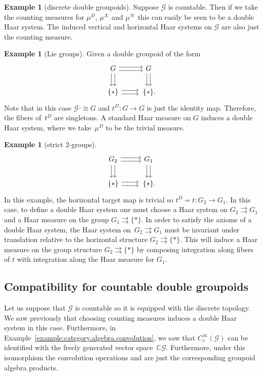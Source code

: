 \documentclass[10pt,a4paper]{amsart}
\numberwithin{equation}{section}
\theoremstyle{definition}
\newtheorem{Example}[Theorem]{Example}
\newcommand{\BBC}{\mathbb{C}}
\newcommand{\CG}{\mathcal{G}}
\newcommand{\CH}{\mathcal{H}}
\newcommand{\CK}{\mathcal{K}}
\newcommand{\stardot}{\overset{{\bullet}}{*}}
\newcommand{\starcirc}{\overset{\circ}{*}}
\newcommand{\darrow}{\arrow[d, shift right] \arrow[d, shift left]}
\newcommand{\rarrow}{\arrow[r, shift right] \arrow[r, shift left]}
\newcommand{\grpd}{\rightrightarrows}
\begin{document}
\begin{Example}[discrete double groupoids]
   Suppose $ \CG $ is countable. Then if we take the counting measures for $ \mu^D$, $ \mu^\CK$ and $ \mu^\CH $ this can easily be seen to be a double Haar system. The induced vertical and horizontal Haar systems on $ \CG $ are also just the counting measure.
\end{Example}
\begin{Example}[Lie groups]\label{example:Lie.groups}
Given a double groupoid of the form
  \[\begin{tikzcd}
G \darrow \rarrow & G \darrow \\
\{*\} \rarrow & \,\{*\}.
\end{tikzcd}
\]
Note that in this case $ \CG^\lrcorner \cong G $ and $ t^D \colon G \to G $ is just the identity map. Therefore, the fibers of~$ t^D $ are singletons. A standard Haar measure on $ G $ induces a double Haar system, where we take~$ \mu^D $ to be the trivial measure.
\end{Example}
\begin{Example}[strict 2-groups]
    \[\begin{tikzcd}
G_2 \darrow \rarrow & G_1 \darrow \\
\{*\} \rarrow & \,\{*\}.
\end{tikzcd}
\]
In this example, the horizontal target map is trivial so $ t^D = t \colon G_2 \to G_1 $. In this case, to define a double Haar system one must choose a Haar system on $ G_2 \grpd G_1 $ and a Haar measure on the group $ G_1 \grpd \{ * \} $. In order to satisfy the axioms of a double Haar system, the Haar system on~${ G_2 \grpd G_1}$ must be invariant under translation relative to the horizontal structure $ G_2 \grpd \{ * \} $. This will induce a Haar measure on the group structure $ G_2 \grpd \{ * \} $ by composing integration along fibers of $ t $ with integration along the Haar measure for $ G_1 $.
\end{Example}
\subsection{Compatibility for countable double groupoids}
Let us suppose that $ \CG $ is countable so it is equipped with the discrete topology. We saw previously that choosing counting measures induces a double Haar system in this case. Furthermore, in Example~\ref{example:category.algebra.convolution}, we saw that $ C_c^\infty(\CG) $ can be identified with the freely generated vector space~$ \BBC \CG $. Furthermore, under this isomorphism the convolution operations \smash{$ \stardot $} and \smash{$ \starcirc$} are just the corresponding groupoid algebra products.
\end{document}
